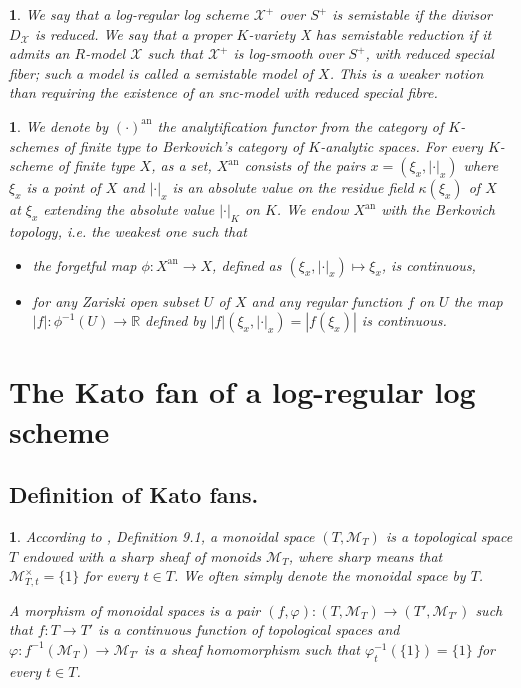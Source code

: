 \documentclass{amsart}%
\numberwithin{equation}{subsection}
\theoremstyle{plain2}
\theoremstyle{definition2}
\theoremstyle{stepstyle}
\theoremstyle{point}
\theoremstyle{subpoint}
\newtheorem{subpoint}[equation]{}%
\newcommand{\spa}[1]{\begin{subpoint}#1\end{subpoint}}           %
\newcommand{\R}{\ensuremath{\mathbb{R}}}
\newcommand{\cX}{\ensuremath{\mathscr{X}}}
\newcommand{\caM}{\ensuremath{\mathcal{M}}}
\renewcommand{\R}{\ensuremath{\mathbb{R}}}
\newcommand{\an}{\mathrm{an}}
\begin{document}
\spa{We say that a log-regular log scheme $\cX^+$ over $S^+$ is semistable if the divisor $D_\cX$ is reduced. We say that a proper $K$-variety X has semistable reduction if it admits an $R$-model $\cX$ such that $\cX^+$ is log-smooth over $S^+$, with reduced special fiber; such a model is called a semistable model of $X$. This is a weaker notion than requiring the existence of an snc-model with reduced special fibre.}

\spa{We denote by $(\cdot)^{\an}$ the analytification functor from the category of $K$-schemes of finite type to Berkovich's category of $K$-analytic spaces. For every $K$-scheme of finite type $X$, as a set, $X^{\an}$ consists of the pairs $x=(\xi_x,|\cdot|_x)$ where $\xi_x$ is a point of $X$ and $|\cdot|_x$ is an absolute value on the residue field $\kappa(\xi_x)$ of $X$ at $\xi_x$ extending the absolute value $|\cdot|_K$ on $K$. We endow $X^{\an}$ with the Berkovich topology, i.e. the weakest one such that \begin{itemize}
\item[(i)] the forgetful map $\phi: X^{\an} \rightarrow X$, defined as $(\xi_x,|\cdot|_x) \mapsto \xi_x$, is continuous,
\item[(ii)] for any Zariski open subset $U$ of $X$ and any regular function $f$ on $U$ the map $|f|:\phi^{-1}(U) \rightarrow \R$ defined by $|f|(\xi_x,|\cdot|_x)=|f(\xi_x)|$ is continuous. 
\end{itemize}}

\section{The Kato fan of a log-regular log scheme} \label{sect kato fan}



\subsection{Definition of Kato fans.}
\spa{ According to \cite{Kato1994a}, Definition 9.1, a monoidal space $(T, \caM_T)$ is a topological space $T$ endowed with a sharp sheaf of monoids $\caM_T$, where \textit{sharp} means that $\caM_{T,t}^\times = \{1\}$ for every $t \in T$. We often simply denote the monoidal space by $T$.

A morphism of monoidal spaces is a pair $(f,\varphi):(T,\caM_T) \rightarrow (T',\caM_{T'})$  such that $f:T \rightarrow T'$ is a continuous function of topological spaces and $\varphi: f^{-1}(\caM_T) \rightarrow \caM_{T'}$ is a sheaf homomorphism such that $\varphi_{t}^{-1}(\{1\})=\{1\}$ for every $t \in T$.}
\end{document}
